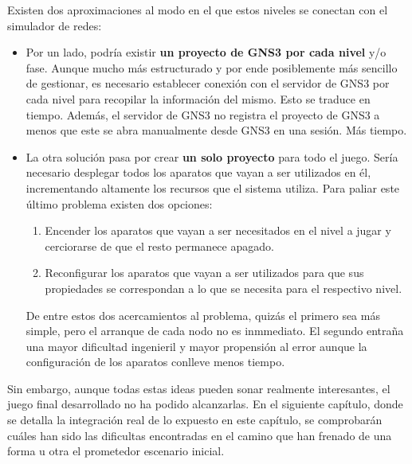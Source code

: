 Existen dos aproximaciones al modo en el que estos niveles se conectan con el simulador de redes:
\begin{itemize}
\item Por un lado, podría existir \textbf{un proyecto de GNS3 por cada nivel} y/o fase. Aunque mucho más estructurado y por ende posiblemente más sencillo de gestionar, es necesario establecer conexión con el servidor de GNS3 por cada nivel para recopilar la información del mismo. Esto se traduce en tiempo. Además, el servidor de GNS3 no registra el proyecto de GNS3 a menos que este se abra manualmente desde GNS3 en una sesión. Más tiempo.
\item La otra solución pasa por crear \textbf{un solo proyecto} para todo el juego. Sería necesario desplegar todos los aparatos que vayan a ser utilizados en él, incrementando altamente los recursos que el sistema utiliza. Para paliar este último problema existen dos opciones:
\begin{enumerate}
\item Encender los aparatos que vayan a ser necesitados en el nivel a jugar y cerciorarse de que el resto permanece apagado.
\item Reconfigurar los aparatos que vayan a ser utilizados para que sus propiedades se correspondan a lo que se necesita para el respectivo nivel.
\end{enumerate}
De entre estos dos acercamientos al problema, quizás el primero sea más simple, pero el arranque de cada nodo no es inmmediato. El segundo entraña una mayor dificultad ingenieril y mayor propensión al error aunque la configuración de los aparatos conlleve menos tiempo.
\end{itemize}

Sin embargo, aunque todas estas ideas pueden sonar realmente interesantes, el juego final desarrollado no ha podido alcanzarlas. En el siguiente capítulo, donde se detalla la integración real de lo expuesto en este capítulo, se comprobarán cuáles han sido las dificultas encontradas en el camino que han frenado de una forma u otra el prometedor escenario inicial. 